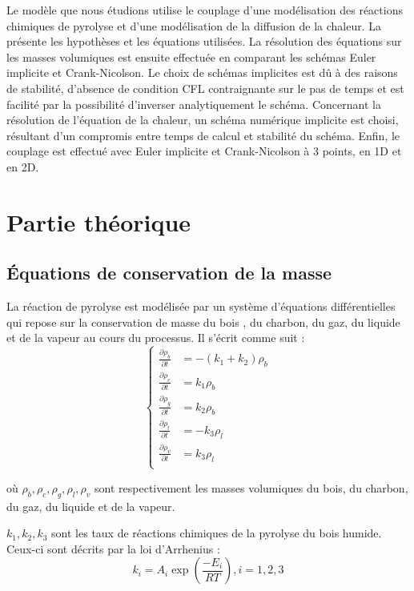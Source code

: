 \documentclass[a4paper,11pt]{article}
\begin{document}
Le modèle que nous étudions utilise le couplage d'une modélisation des réactions chimiques de pyrolyse et d'une modélisation de la diffusion de la chaleur. La  présente les hypothèses et les équations utilisées. La résolution des équations sur les masses volumiques est ensuite effectuée en comparant les schémas Euler implicite et Crank-Nicolson. Le choix de schémas implicites est dû à des raisons de stabilité, d'absence de condition CFL contraignante sur le pas de temps et est facilité par la possibilité d'inverser analytiquement le schéma. Concernant la résolution de l'équation de la chaleur, un schéma numérique implicite est choisi, résultant d'un compromis entre temps de calcul et stabilité du schéma. Enfin, le couplage est effectué avec Euler implicite et Crank-Nicolson à 3 points, en 1D et en 2D.


\section{Partie théorique}\label{sec:theo}
\subsection{Équations de conservation de la masse}
La réaction de pyrolyse est modélisée par un système d'équations différentielles qui repose sur la conservation de masse du bois \cite{1}, du charbon, du gaz, du liquide et de la vapeur au cours du processus. Il s'écrit comme suit :
\begin{equation}\label{eq:1}
	\left\lbrace
		\begin{aligned}
			\frac{\partial \rho_b}{\partial t} &= -(k_1 + k_2)\rho_b \\
                \frac{\partial \rho_c}{\partial t} &= k_1\rho_b\\
                \frac{\partial \rho_g}{\partial t} &= k_2\rho_b\\
                \frac{\partial \rho_l}{\partial t} &= -k_3\rho_l\\
                \frac{\partial \rho_v}{\partial t} &= k_3\rho_l\\
		\end{aligned}
	\right.
\end{equation}

où $\rho_b, \rho_c, \rho_g, \rho_l, \rho_v$ sont respectivement les masses volumiques du bois, du charbon, du gaz, du liquide et de la vapeur.

$k_1, k_2, k_3$ sont les taux de réactions chimiques de la pyrolyse du bois humide. Ceux-ci sont décrits par la loi d'Arrhenius \cite{1}: 
\begin{equation}\label{eq:2}
    k_i = A_i\exp{\left(\frac{-E_i}{RT}\right)}, i = 1,2,3
\end{equation}
\end{document}
